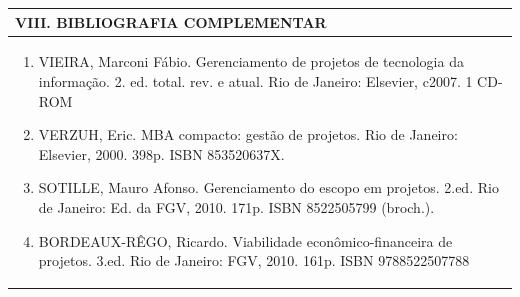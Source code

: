 \documentclass[12pt]{article}
\begin{document}

\begin{longtable}{|L{1.025\textwidth}|} \hline
%
{\bf VIII. BIBLIOGRAFIA COMPLEMENTAR} \\ \hline
\begin{enumerate}

\item VIEIRA, Marconi Fábio. Gerenciamento de projetos de tecnologia da informação. 2. ed. total. rev. e atual. Rio de Janeiro: Elsevier, c2007. 1 CD-ROM
\item VERZUH, Eric. MBA compacto: gestão de projetos. Rio de Janeiro: Elsevier, 2000. 398p. ISBN 853520637X.
\item SOTILLE, Mauro Afonso. Gerenciamento do escopo em projetos. 2.ed. Rio de Janeiro: Ed. da FGV, 2010. 171p. ISBN 8522505799 (broch.).
\item BORDEAUX-RÊGO, Ricardo. Viabilidade econômico-financeira de projetos. 3.ed. Rio de Janeiro: FGV, 2010. 161p. ISBN 9788522507788


%
\end{enumerate}
 \\ \hline
\end{longtable}



\end{document}
